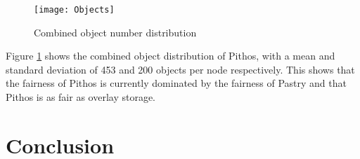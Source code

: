 \begin{figure}[htbp]
 \centering
 \texttt{[image: Objects]}
 \caption{Combined object number distribution}
 \label{fig_objects}
\end{figure}
%
Figure \ref{fig_objects} shows the combined object distribution of Pithos, with a mean and standard deviation of 453 and 200 objects per node
respectively. This shows that the fairness of Pithos is currently dominated by the fairness of Pastry and that Pithos is as fair as overlay storage.

\section{Conclusion}
